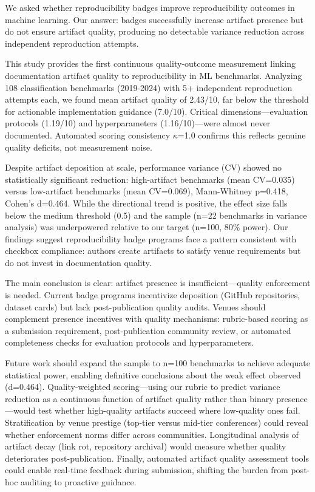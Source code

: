 
We asked whether reproducibility badges improve reproducibility outcomes in machine learning. Our answer: badges successfully increase artifact presence but do not ensure artifact quality, producing no detectable variance reduction across independent reproduction attempts.

This study provides the first continuous quality-outcome measurement linking documentation artifact quality to reproducibility in ML benchmarks. Analyzing 108 classification benchmarks (2019-2024) with 5+ independent reproduction attempts each, we found mean artifact quality of 2.43/10, far below the threshold for actionable implementation guidance (7.0/10). Critical dimensions---evaluation protocols (1.19/10) and hyperparameters (1.16/10)---were almost never documented. Automated scoring consistency $\kappa$=1.0 confirms this reflects genuine quality deficits, not measurement noise.

Despite artifact deposition at scale, performance variance (CV) showed no statistically significant reduction: high-artifact benchmarks (mean CV=0.035) versus low-artifact benchmarks (mean CV=0.069), Mann-Whitney p=0.418, Cohen's d=0.464. While the directional trend is positive, the effect size falls below the medium threshold (0.5) and the sample (n=22 benchmarks in variance analysis) was underpowered relative to our target (n=100, 80\% power). Our findings suggest reproducibility badge programs face a pattern consistent with checkbox compliance: authors create artifacts to satisfy venue requirements but do not invest in documentation quality.

The main conclusion is clear: artifact presence is insufficient---quality enforcement is needed. Current badge programs incentivize deposition (GitHub repositories, dataset cards) but lack post-publication quality audits. Venues should complement presence incentives with quality mechanisms: rubric-based scoring as a submission requirement, post-publication community review, or automated completeness checks for evaluation protocols and hyperparameters.

Future work should expand the sample to n=100 benchmarks to achieve adequate statistical power, enabling definitive conclusions about the weak effect observed (d=0.464). Quality-weighted scoring---using our rubric to predict variance reduction as a continuous function of artifact quality rather than binary presence---would test whether high-quality artifacts succeed where low-quality ones fail. Stratification by venue prestige (top-tier versus mid-tier conferences) could reveal whether enforcement norms differ across communities. Longitudinal analysis of artifact decay (link rot, repository archival) would measure whether quality deteriorates post-publication. Finally, automated artifact quality assessment tools could enable real-time feedback during submission, shifting the burden from post-hoc auditing to proactive guidance.

